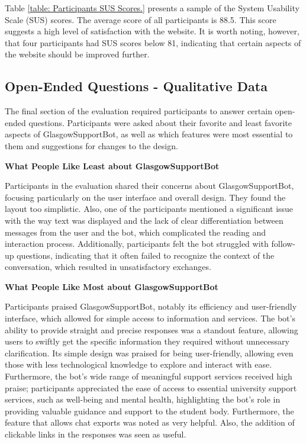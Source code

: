 \documentclass{l4proj}
\begin{document}
Table \ref{table: Participants SUS Scores.} presents a sample of the System Usability Scale (SUS) scores. The average score of all participants is 88.5. This score suggests a high level of satisfaction with the website. It is worth noting, however, that four participants had SUS scores below 81, indicating that certain aspects of the website should be improved further.

\subsection{Open-Ended Questions - Qualitative Data}

The final section of the evaluation required participants to answer certain open-ended questions.
Participants were asked about their favorite and least favorite aspects of GlasgowSupportBot, as well as which features were most essential to them and suggestions for changes to the design.

\textbf{What People Like Least about GlasgowSupportBot}

Participants in the evaluation shared their concerns about GlasgowSupportBot, focusing particularly on the user interface and overall design. They found the layout too simplistic. Also, one of the participants mentioned a significant issue with the way text was displayed and the lack of clear differentiation between messages from the user and the bot, which complicated the reading and interaction process. Additionally, participants felt the bot struggled with follow-up questions, indicating that it often failed to recognize the context of the conversation, which resulted in unsatisfactory exchanges.

\textbf{What People Like Most about GlasgowSupportBot}

Participants praised GlasgowSupportBot, notably its efficiency and user-friendly interface, which allowed for simple access to information and services. The bot's ability to provide straight and precise responses was a standout feature, allowing users to swiftly get the specific information they required without unnecessary clarification. Its simple design was praised for being user-friendly, allowing even those with less technological knowledge to explore and interact with ease. Furthermore, the bot's wide range of meaningful support services received high praise; participants appreciated the ease of access to essential university support services, such as well-being and mental health, highlighting the bot's role in providing valuable guidance and support to the student body. Furthermore, the feature that allows chat exports was noted as very helpful. Also, the addition of clickable links in the responses was seen as useful.
\end{document}

